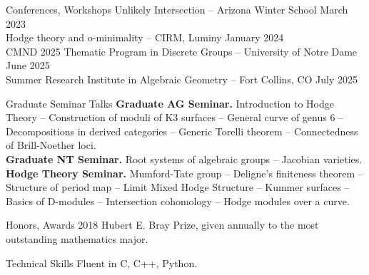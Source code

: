 \documentclass[
	12pt, %
]{resume} %
\begin{document}
\begin{rSection}{Conferences, Workshops}
    Unlikely Intersection -- Arizona Winter School \hfill March 2023\\
    Hodge theory and o-minimality -- CIRM, Luminy \hfill January 2024\\
    CMND 2025 Thematic Program in Discrete Groups -- University of Notre Dame \hfill June 2025\\
    Summer Research Institute in Algebraic Geometry -- Fort Collins, CO \hfill July 2025
\end{rSection}

\begin{rSection}{Graduate Seminar Talks}
    \textbf{Graduate AG Seminar.} Introduction to Hodge Theory -- Construction of moduli of K3 surfaces -- General curve of genus 6 -- Decompositions in derived categories -- Generic Torelli theorem -- Connectedness of Brill-Noether loci.\\
    \textbf{Graduate NT Seminar.} Root systems of algebraic groups -- Jacobian varieties. \\
    \textbf{Hodge Theory Seminar.} Mumford-Tate group -- Deligne's finiteness theorem -- Structure of period map -- Limit Mixed Hodge Structure -- Kummer surfaces -- Basics of D-modules -- Intersection cohomology -- Hodge modules over a curve. 
\end{rSection}
\begin{rSection}{Honors, Awards}
    2018 Hubert E. Bray Prize, given annually to the most outstanding mathematics major.
\end{rSection}
\begin{rSection}{Technical Skills}
    Fluent in C, C++, Python. 
\end{rSection}
\end{document}
